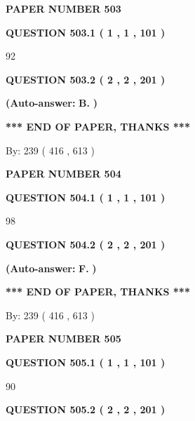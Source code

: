 \documentclass[12pt]{article}
\begin{document}
   
\newpage 
\setcounter{page}{ 
   503001 } 
   
   
 {\textbf{ \Large{ PAPER NUMBER  503  }}}
   
   
   
   
  
  
{\textbf{\large{QUESTION
503.1 
 ( 1 , 1 , 101 )
}}}

92
  
  
{\textbf{\large{QUESTION
503.2 
 ( 2 , 2 , 201 )
}}}
 
 
{\textbf{(Auto-answer:}}
{\textbf{\large{
B.}}}
{\textbf{)}}
 
 
   
   
   
   
\vspace{1.0in} 
{\textbf{\large{ *** END OF PAPER, THANKS *** }}} 
   
   
\hspace{1.0in} By: 
 239 ( 416 ,  613 )
   
   
   
   
\newpage 
\setcounter{page}{ 
   504001 } 
   
   
 {\textbf{ \Large{ PAPER NUMBER  504  }}}
   
   
   
   
  
  
{\textbf{\large{QUESTION
504.1 
 ( 1 , 1 , 101 )
}}}

98
  
  
{\textbf{\large{QUESTION
504.2 
 ( 2 , 2 , 201 )
}}}
 
 
{\textbf{(Auto-answer:}}
{\textbf{\large{
F.}}}
{\textbf{)}}
 
 
   
   
   
   
\vspace{1.0in} 
{\textbf{\large{ *** END OF PAPER, THANKS *** }}} 
   
   
\hspace{1.0in} By: 
 239 ( 416 ,  613 )
   
   
   
   
\newpage 
\setcounter{page}{ 
   505001 } 
   
   
 {\textbf{ \Large{ PAPER NUMBER  505  }}}
   
   
   
   
  
  
{\textbf{\large{QUESTION
505.1 
 ( 1 , 1 , 101 )
}}}

90
  
  
{\textbf{\large{QUESTION
505.2 
 ( 2 , 2 , 201 )
}}}
 
\end{document}
